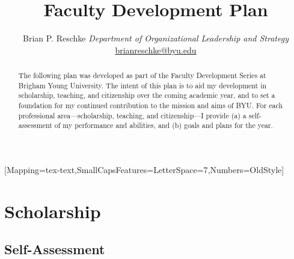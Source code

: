\documentclass[11pt,article,oneside]{memoir}
\author{\Large Brian P. Reschke\vspace{0.05in} \newline\normalsize\emph{Department of Organizational Leadership and Strategy} \newline\footnotesize \protect\url{brianreschke@byu.edu}\vspace*{0.2in}\newline }
\date{}
\def\mytitle{\LARGE Faculty Development Plan}
\begin{document}


\setmainfont{Minion Pro}[Mapping=tex-text,SmallCapsFeatures={LetterSpace=7},Numbers=OldStyle]
\setsansfont[Mapping=tex-text]{Minion Pro}
\setmonofont[Mapping=tex-text,Scale=0.9]{Inconsolata}
\pagestyle{kjh}
\setcounter{secnumdepth}{-1}


\title{\mytitle}
\maketitle



\begin{abstract}

\noindent The following plan was developed as part of the Faculty Development
Series at Brigham Young University. The intent of this plan is to aid my
development in scholarship, teaching, and citizenship over the coming
academic year, and to set a foundation for my continued contribution to
the mission and aims of BYU. For each professional area---scholarship,
teaching, and citizenship---I provide (a) a self-assessment of my
performance and abilities, and (b) goals and plans for the year.

\end{abstract}


\section{Scholarship}\label{scholarship}

\subsection{Self-Assessment}\label{self-assessment}
\end{document}
